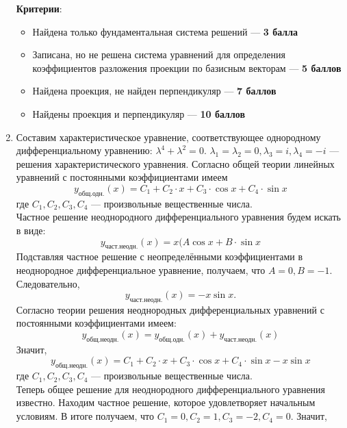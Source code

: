 \documentclass[pdftex,12pt,a4paper]{article}
\begin{document}
\begin{enumerate}
\textbf{Критерии}:
\begin{itemize}
\item Найдена только фундаментальная система решений --- \textbf{3 балла}
\item Записана, но не решена система уравнений для определения коэффициентов разложения проекции по базисным векторам --- \textbf{5 баллов}
\item Найдена проекция, не найден перпендикуляр --- \textbf{7 баллов}
\item Найдены проекция и перпендикуляр --- \textbf{10 баллов}
\end{itemize}
\smallskip
\item Составим характеристическое уравнение, соответствующее однородному дифференциальному уравнению: $\lambda^4+\lambda^2=0$.
\smallskip
$\lambda_1=\lambda_2=0, \lambda_3=i,\lambda_4=-i$ --- решения характеристического уравнения.
Согласно общей теории линейных уравнений с постоянными коэффициентами имеем 
\begin{equation}
y_{\text{общ.одн.}}(x)=C_1+C_2\cdot x+C_3\cdot \cos x+C_4\cdot \sin x
\end{equation} где $C_1,C_2,C_3,C_4$ --- произвольные вещественные числа.\\
Частное решение неоднородного дифференциального уравнения будем искать в виде:
\begin{equation}
y_{\text{част.неодн.}}(x)=x(A \cos x+B\cdot \sin x
\end{equation}
Подставляя частное решение с неопределёнными коэффициентами в неоднородное дифференциальное уравнение, получаем, что $A=0, B=-1$. \\
Следовательно, 
\begin{equation}
y_{\text{част.неодн.}}(x)=-x\sin x.
\end{equation}
Согласно теории решения неоднородных дифференциальных уравнений с постоянными коэффициентами имеем:
\begin{equation}
y_{\text{общ.неодн.}}(x)=y_{\text{общ.одн.}}(x)+y_{\text{част.неодн.}}(x)
\end{equation}
Значит,
\begin{equation}
y_{\text{общ.неодн.}}(x)=C_1+C_2\cdot x+C_3\cdot \cos x+C_4\cdot \sin x-x\sin x
\end{equation} где $C_1,C_2,C_3,C_4$ --- произвольные вещественные числа.\\
Теперь общее решение для неоднородного дифференциального уравнения известно. Находим частное решение, которое удовлетворяет начальным условиям. В итоге получаем, что $C_1=0, C_2=1, C_3=-2, C_4=0$. Значит,

\end{enumerate}
\end{document}
